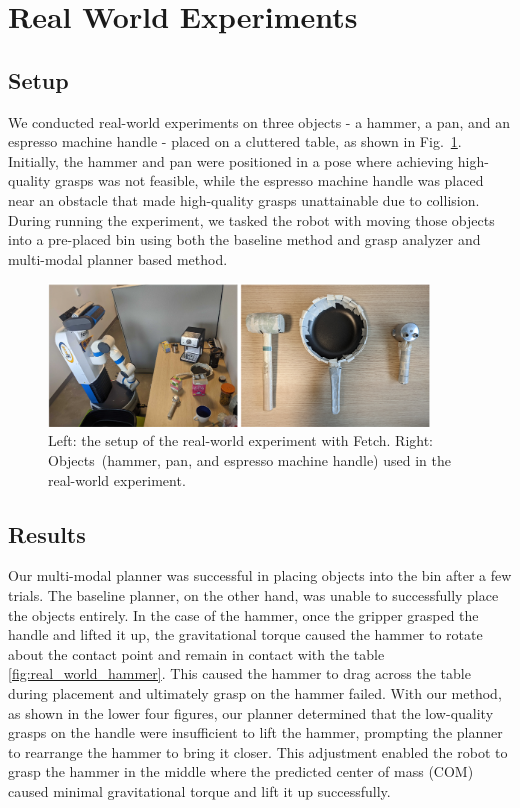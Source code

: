 \documentclass[12pt]{ucsddissertation}
\begin{document}
\section{Real World Experiments}

\subsection{Setup}

We conducted real-world experiments on three objects - a hammer, a pan, and an espresso machine handle - placed on a cluttered table, as shown in Fig.~\ref{manipulation_objects}. Initially, the hammer and pan were positioned in a pose where achieving high-quality grasps was not feasible, while the espresso machine handle was placed near an obstacle that made high-quality grasps unattainable due to collision. During running the experiment, we tasked the robot with moving those objects into a pre-placed bin using both the baseline method and grasp analyzer and multi-modal planner based method.

\begin{figure}
	\centering
	\includegraphics[width=0.9\textwidth]{figures/objects.png}
	\caption{\label{manipulation_objects} Left: the setup of the real-world experiment with Fetch. Right: Objects~(hammer, pan, and espresso machine handle) used in the real-world experiment.}
\end{figure}

\subsection{Results} 
Our multi-modal planner was successful in placing objects into the bin after a few trials. The baseline planner, on the other hand, was unable to successfully place the objects entirely. In the case of the hammer, once the gripper grasped the handle and lifted it up, the gravitational torque caused the hammer to rotate about the contact point and remain in contact with the table \ref{fig:real_world_hammer}. This caused the hammer to drag across the table during placement and ultimately grasp on the hammer failed. With our method, as shown in the lower four figures, our planner determined that the low-quality grasps on the handle were insufficient to lift the hammer, prompting the planner to rearrange the hammer to bring it closer. This adjustment enabled the robot to grasp the hammer in the middle where the predicted center of mass (COM) caused minimal gravitational torque and lift it up successfully.
\end{document}
